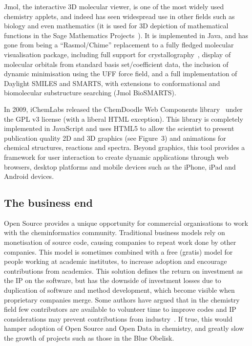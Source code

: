 \documentclass[10pt]{bmc_article}
\newenvironment{bmcformat}{\fussy\setboolean{publ}{true}}{\fussy}
\begin{document}
\begin{bmcformat}
Jmol, the interactive 3D molecular viewer, is one of the most widely used
chemistry applets, and indeed has
seen widespread use in other fields such as biology and 
even mathematics (it is used for 3D depiction of mathematical
functions in the Sage Mathematics Projects~\cite{WebSage}). It is implemented
in Java, and has gone from being a ``Rasmol/Chime'' replacement to a fully fledged molecular
visualisation package, including full support for crystallography~\cite{Hanson2010},
display of molecular orbitals from standard basis set/coefficient data,
the inclusion of dynamic minimisation using the UFF force field, and
a full implementation of Daylight SMILES and SMARTS, with extensions to
conformational and biomolecular substructure searching (Jmol
BioSMARTS).

In 2009, iChemLabs released the ChemDoodle Web Components
library~\cite{ChemDoodleWeb} under the GPL v3 license (with a
liberal HTML exception). This library is completely implemented in JavaScript
and uses HTML5 to allow the scientist
to present publication quality 2D and 3D graphics (see Figure~3) and animations for
chemical structures, reactions and spectra. Beyond graphics, this tool
provides a framework for user interaction to create dynamic
applications through web browsers, desktop platforms and mobile
devices such as the iPhone, iPad and Android devices.

\subsection*{The business end}


Open Source provides a unique opportunity for commercial organisations to work with the
cheminformatics community. Traditional business models rely on monetisation of source
code, causing companies to repeat work done by other companies. This
model is sometimes combined
with a free (gratis) model for people working at academic institutes, to increase adoption
and encourage contributions from academics. This solution defines the return on investment as the IP on the software,
but has the downside of investment losses due to duplication of
software and method development, which become visible when proprietary companies
merge. Some authors have argued that in the chemistry field
few contributors are available to volunteer time
to improve codes and IP considerations may prevent contributions from
industry~\cite{Stahl:2005fk}. If true, this would hamper
adoption of Open Source and Open Data in chemistry, and greatly slow
the growth of projects such as those in the Blue Obelisk.


\end{bmcformat}
\end{document}
